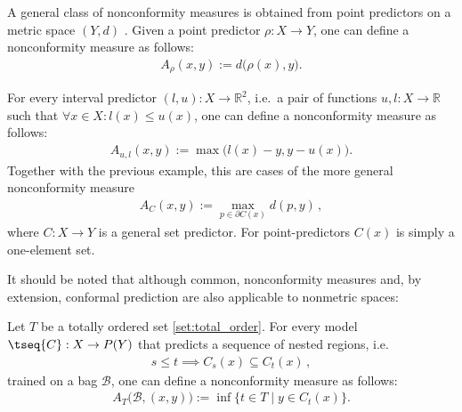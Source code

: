     \begin{example}
        A general class of nonconformity measures is obtained from point predictors on a metric space $(Y,d)$ . Given a point predictor $\rho:X\rightarrow Y$, one can define a nonconformity measure as follows:
        \begin{gather}
            A_\rho(x,y) := d\big(\rho(x),y\big).
        \end{gather}
    \end{example}
    \begin{example}
        For every interval predictor $(l,u):X\rightarrow\mathbb{R}^2$, i.e.~a pair of functions $u,l:X\rightarrow\mathbb{R}$ such that $\forall x\in X:l(x)\leq u(x)$, one can define a nonconformity measure as follows:
        \begin{gather}
            A_{u,l}(x,y) := \max\big(l(x)-y,y-u(x)\big).
        \end{gather}
        Together with the previous example, this are cases of the more general nonconformity measure
        \begin{gather}
            A_C(x,y) := \max_{p\in\partial C(x)}d(p,y)\,,
        \end{gather}
        where $C:X\rightarrow Y$ is a general set predictor. For point-predictors $C(x)$ is simply a one-element set.
    \end{example}

    It should be noted that although common, nonconformity measures and, by extension, conformal prediction are also applicable to nonmetric spaces:
    \begin{example}
        Let $T$ be a totally ordered set \ref{set:total_order}. For every model $\tseq{C}:X\rightarrow P(Y)$ that predicts a sequence of nested regions, i.e.
        \begin{gather}
            s\leq t\implies C_s(x)\subseteq C_t(x)\,,
        \end{gather}
        trained on a bag $\mathcal{B}$, one can define a nonconformity measure as follows:
        \begin{gather}
            A_T\big(\mathcal{B},(x,y)\big) := \inf\{t\in T\mid y\in C_t(x)\}.
        \end{gather}
    \end{example}

